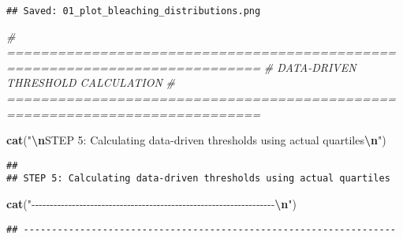 \documentclass[
]{article}
\newenvironment{Shaded}{\begin{snugshade}}{\end{snugshade}}
\newcommand{\AttributeTok}[1]{\textcolor[rgb]{0.13,0.29,0.53}{#1}}
\newcommand{\CommentTok}[1]{\textcolor[rgb]{0.56,0.35,0.01}{\textit{#1}}}
\newcommand{\DecValTok}[1]{\textcolor[rgb]{0.00,0.00,0.81}{#1}}
\newcommand{\FloatTok}[1]{\textcolor[rgb]{0.00,0.00,0.81}{#1}}
\newcommand{\FunctionTok}[1]{\textcolor[rgb]{0.13,0.29,0.53}{\textbf{#1}}}
\newcommand{\NormalTok}[1]{#1}
\newcommand{\OtherTok}[1]{\textcolor[rgb]{0.56,0.35,0.01}{#1}}
\newcommand{\SpecialCharTok}[1]{\textcolor[rgb]{0.81,0.36,0.00}{\textbf{#1}}}
\newcommand{\StringTok}[1]{\textcolor[rgb]{0.31,0.60,0.02}{#1}}
\begin{document}
\begin{verbatim}
## Saved: 01_plot_bleaching_distributions.png
\end{verbatim}

\begin{Shaded}
\begin{Highlighting}[]
\CommentTok{\# ============================================================================}
\CommentTok{\# DATA{-}DRIVEN THRESHOLD CALCULATION}
\CommentTok{\# ============================================================================}

\FunctionTok{cat}\NormalTok{(}\StringTok{"}\SpecialCharTok{\textbackslash{}n}\StringTok{STEP 5: Calculating data{-}driven thresholds using actual quartiles}\SpecialCharTok{\textbackslash{}n}\StringTok{"}\NormalTok{)}
\end{Highlighting}
\end{Shaded}

\begin{verbatim}
## 
## STEP 5: Calculating data-driven thresholds using actual quartiles
\end{verbatim}

\begin{Shaded}
\begin{Highlighting}[]
\FunctionTok{cat}\NormalTok{(}\StringTok{"{-}{-}{-}{-}{-}{-}{-}{-}{-}{-}{-}{-}{-}{-}{-}{-}{-}{-}{-}{-}{-}{-}{-}{-}{-}{-}{-}{-}{-}{-}{-}{-}{-}{-}{-}{-}{-}{-}{-}{-}{-}{-}{-}{-}{-}{-}{-}{-}{-}{-}{-}{-}{-}{-}{-}{-}{-}{-}{-}{-}{-}{-}{-}{-}{-}{-}}\SpecialCharTok{\textbackslash{}n}\StringTok{"}\NormalTok{)}
\end{Highlighting}
\end{Shaded}

\begin{verbatim}
## ------------------------------------------------------------------
\end{verbatim}

\begin{Shaded}
\end{Shaded}
\end{document}

